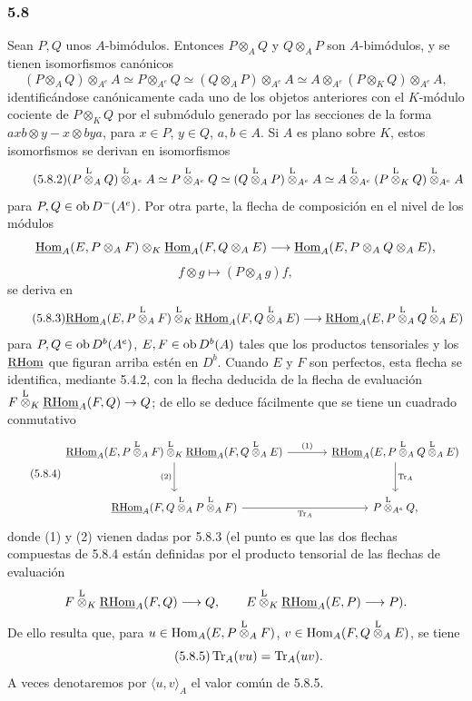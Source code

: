 \subsubsection*{5.8}

Sean $P,Q$ unos $A$-bimódulos. Entonces $P\otimes_AQ$ y $Q\otimes_AP$ son $A$-bimódulos, y se tienen isomorfismos canónicos
\begin{equation}\tag{5.8.1}
(P\otimes_AQ)\otimes_{A^e}A\simeq P\otimes_{A^e}Q\simeq(Q\otimes_AP)\otimes_{A^e}A\simeq A\otimes_{A^e}(P\otimes_KQ)\otimes_{A^e}A,
\end{equation}
identificándose canónicamente cada uno de los objetos anteriores con el $K$-módulo cociente de $P\otimes_KQ$ por el submódulo generado por las secciones de la forma $axb\otimes y-x\otimes bya$, para $x\in P$, $y\in Q$, $a,b\in A$. Si $A$ es plano sobre $K$, estos isomorfismos se derivan en isomorfismos
\begin{equation}\tag{5.8.2}
(P\overset{\mathrm L}{\otimes}_AQ)\overset{\mathrm L}{\otimes}_{A^e}A\simeq P\overset{\mathrm L}{\otimes}_{A^e}Q\simeq(Q\overset{\mathrm L}{\otimes}_AP)\overset{\mathrm L}{\otimes}_{A^e}A\simeq A\overset{\mathrm L}{\otimes}_{A^e}(P\overset{\mathrm L}{\otimes}_KQ)\overset{\mathrm L}{\otimes}_{A^e}A
\end{equation}
para $P,Q\in\operatorname{ob} D^-(A^e)$. Por otra parte, la flecha de composición en el nivel de los módulos
\[
\underline{\operatorname{Hom}}_A(E,P\otimes_AF)\otimes_K\underline{\operatorname{Hom}}_A(F,Q\otimes_AE)
\longrightarrow\underline{\operatorname{Hom}}_A(E,P\otimes_AQ\otimes_AE),
\]
\[
f\otimes g\longmapsto (P\otimes_Ag)f,
\]
se deriva en
\begin{equation}\tag{5.8.3}
\underline{\mathrm{RHom}}_A(E,P\overset{\mathrm L}{\otimes}_AF)\overset{\mathrm L}{\otimes}_K\underline{\mathrm{RHom}}_A(F,Q\overset{\mathrm L}{\otimes}_AE)
\longrightarrow\underline{\mathrm{RHom}}_A(E,P\overset{\mathrm L}{\otimes}_AQ\overset{\mathrm L}{\otimes}_AE)
\end{equation}
para $P,Q\in\operatorname{ob} D^b(A^e)$, $E,F\in\operatorname{ob} D^b(A)$ tales que los productos tensoriales y los $\underline{\mathrm{RHom}}$ que figuran arriba estén en $D^b$. Cuando $E$ y $F$ son perfectos, esta flecha se identifica, mediante 5.4.2, con la flecha deducida de la flecha de evaluación $F\overset{\mathrm L}{\otimes}_K\underline{\mathrm{RHom}}_A(F,Q)\to Q$; de ello se deduce fácilmente que se tiene un cuadrado conmutativo
\begin{equation}\tag{5.8.4}
\begin{tikzcd}[column sep=large,row sep=large]
\uRHom_A(E,P\lten_AF)\lten_K\uRHom_A(F,Q\lten_AE) \arrow[r,"(1)"] \arrow[d,"(2)"'] & \uRHom_A(E,P\lten_AQ\lten_AE) \arrow[d,"\Tr_A"]\\
\uRHom_A(F,Q\lten_AP\lten_AF) \arrow[r,"\Tr_A"'] & P\lten_{A^e}Q,
\end{tikzcd}
\end{equation}
donde (1) y (2) vienen dadas por 5.8.3 (el punto es que las dos flechas compuestas de 5.8.4 están definidas por el producto tensorial de las flechas de evaluación
\[
F\overset{\mathrm L}{\otimes}_K\underline{\mathrm{RHom}}_A(F,Q)\longrightarrow Q,\qquad
E\overset{\mathrm L}{\otimes}_K\underline{\mathrm{RHom}}_A(E,P)\longrightarrow P).
\]
De ello resulta que, para $u\in\operatorname{Hom}_A(E,P\overset{\mathrm L}{\otimes}_AF)$, $v\in\operatorname{Hom}_A(F,Q\overset{\mathrm L}{\otimes}_AE)$, se tiene
\begin{equation}\tag{5.8.5}
\operatorname{Tr}_A(vu)=\operatorname{Tr}_A(uv).
\end{equation}
A veces denotaremos por $\langle u,v\rangle_A$ el valor común de 5.8.5.
